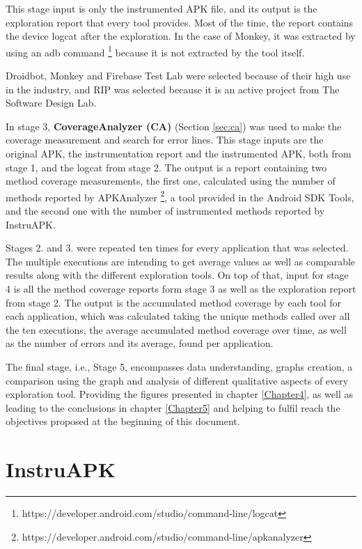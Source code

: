 This stage input is only the instrumented APK file, and its output is the exploration report that every tool provides. Most of the time, the report contains the device logcat after the exploration. In the case of Monkey, it was extracted by using an adb command \footnote{https://developer.android.com/studio/command-line/logcat} because it is not extracted by the tool itself.

Droidbot, Monkey and Firebase Test Lab were selected because of their high use in the industry, and RIP was selected because it is an active project from The Software Design Lab. 

In stage 3, \textbf{CoverageAnalyzer (CA)} (Section \ref{sec:ca}) was used to make the coverage measurement and search for error lines. This stage inputs are the original APK, the instrumentation report and the instrumented APK, both from stage 1, and the logcat from stage 2. The output is a report containing two method coverage measurements, the first one, calculated using the number of methods reported by APKAnalyzer \footnote{https://developer.android.com/studio/command-line/apkanalyzer}, a tool provided in the Android SDK Tools, and the second one with the number of instrumented methods reported by InstruAPK.

Stages 2. and 3. were repeated ten times for every application that was selected. The multiple executions are intending to get average values as well as comparable results along with the different exploration tools. On top of that, input for stage 4 is all the method coverage reports form stage 3 as well as the exploration report from stage 2. The output is the accumulated method coverage by each tool for each application, which was calculated taking the unique methods called over all the ten executions, the average accumulated method coverage over time, as well as the number of errors and its average, found per application.

The final stage, i.e.,  Stage 5,  encompasses data understanding, graphs creation, a comparison using the graph and analysis of different qualitative aspects of every exploration tool. Providing the figures presented in chapter \ref{Chapter4}, as well as leading to the conclusions in chapter \ref{Chapter5} and helping to fulfil reach the objectives proposed at the beginning of this document.

\section{InstruAPK}\label{sec:instruAPK}

